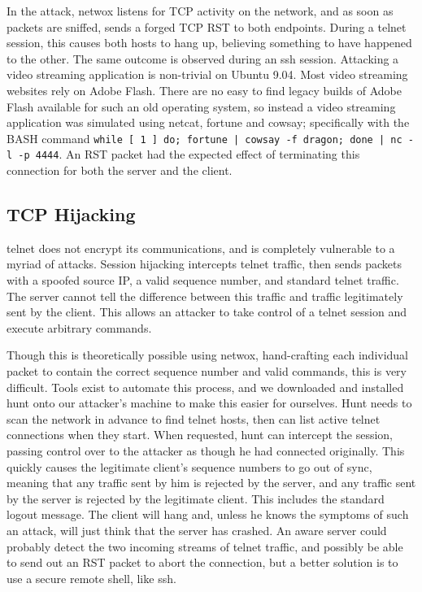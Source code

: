In the attack, netwox %
listens for TCP activity on the network, and as soon as packets are sniffed, sends a forged TCP RST to both endpoints.
During a telnet session, this causes both hosts to hang up, believing something to have happened to the other. The same
outcome is observed during an ssh session. Attacking a video streaming application is non-trivial on Ubuntu 9.04. Most
video streaming websites rely on Adobe Flash. There are no easy to find legacy builds of Adobe Flash available for such
an old operating system, so instead a video streaming application was simulated using netcat, fortune and cowsay;
specifically with the BASH command {\tt while [ 1 ] do; fortune | cowsay -f dragon; done | nc -l -p 4444}. An RST packet
had the expected effect of terminating this connection for both the server and the client.

\subsection{TCP Hijacking}

telnet does not encrypt its communications, and is completely vulnerable to a myriad of attacks. Session hijacking
intercepts telnet traffic, then sends packets with a spoofed source IP, a valid sequence number, and standard telnet
traffic. The server cannot tell the difference between this traffic and traffic legitimately sent by the client. This
allows an attacker to take control of a telnet session and execute arbitrary commands.

Though this is theoretically possible using netwox, hand-crafting each individual packet to contain the correct sequence
number and valid commands, this is very difficult. Tools exist to automate this process, and we downloaded and installed
hunt onto our attacker's machine to make this easier for ourselves. Hunt needs to scan the network in advance to find
telnet hosts, then can list active telnet connections when they start. When requested, hunt can intercept the session,
passing control over to the attacker as though he had connected originally. This quickly causes the legitimate client's
sequence numbers to go out of sync, meaning that any traffic sent by him is rejected by the server, and any traffic sent
by the server is rejected by the legitimate client. This includes the standard logout message. The client will hang and,
unless he knows the symptoms of such an attack, will just think that the server has crashed. An aware server could
probably detect the two incoming streams of telnet traffic, and possibly be able to send out an RST packet to abort the
connection, but a better solution is to use a secure remote shell, like ssh.


